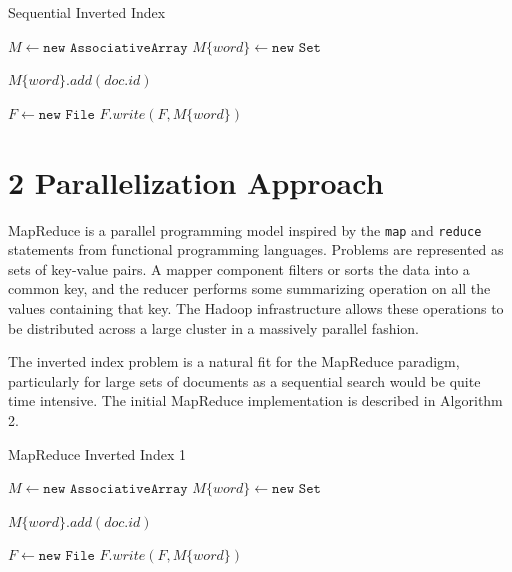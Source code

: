 \documentclass{bsu-ms}
\begin{document}
\begin{algorithm}
\caption{Sequential Inverted Index }
\label{alg:alg1}
\begin{algorithmic}[0]
	\State $M \gets \texttt{new AssociativeArray}$
   		        \State $M\{word\} \gets \texttt{new Set}$
		    \EndIf
		    
		\State $M\{word\}.add(doc.id)$
     	\EndFor
	\EndFor

   \State $F \gets \texttt{new File}$
   		\State $F.write(F, M\{word\})$
    \EndFor
	
\EndProcedure	
\end{algorithmic}
\end{algorithm}

\section*{2 Parallelization Approach}

MapReduce is a parallel programming model inspired by the \texttt{map} and \texttt{reduce} statements from functional programming languages. Problems are represented as sets of key-value pairs. A mapper component filters or sorts the data into a common key, and the reducer performs some summarizing operation on all the values containing that key. The Hadoop infrastructure allows these operations to be distributed across a large cluster in a massively parallel fashion.

The inverted index problem is a natural fit for the MapReduce paradigm, particularly for large sets of documents as a sequential search would be quite time intensive. The initial MapReduce implementation is described in Algorithm 2.

\begin{algorithm}
	\caption{MapReduce Inverted Index 1}
	\label{alg:alg2}
	\begin{algorithmic}[0]
		\State $M \gets \texttt{new AssociativeArray}$
		\State $M\{word\} \gets \texttt{new Set}$
		\EndIf
		
		\State $M\{word\}.add(doc.id)$
		\EndFor
		\EndFor
		
		\State $F \gets \texttt{new File}$
		\State $F.write(F, M\{word\})$
		\EndFor
		
		\EndProcedure	
	\end{algorithmic}
\end{algorithm}
\end{document}
